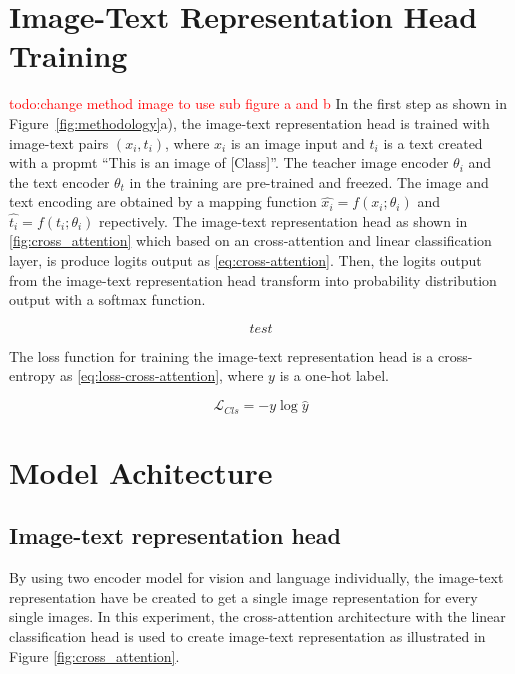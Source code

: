 \section{Image-Text Representation Head Training}
\textcolor{red}{todo:change method image to use sub figure a and b}
In the first step as shown in Figure~\ref{fig:methodology}a), the image-text representation head is trained with image-text pairs $(x_i, t_i)$, where $x_i$ is an image input and $t_i$ is a text created with a propmt ``This is an image of [Class]''.
The teacher image encoder $\theta_i$ and the text encoder $\theta_t$ in the training are pre-trained and freezed.
The image and text encoding are obtained by a mapping function $\hat{x_i} = f(x_i; \theta_i)$ and $\hat{t_i} = f(t_i; \theta_i)$ repectively. 
The image-text representation head as shown in \ref{fig:cross_attention} which based on an cross-attention and linear classification layer, is produce logits output as \ref{eq:cross-attention}.
Then, the logits output from the image-text representation head transform into probability distribution output with a softmax function.

\begin{equation} 
    \label{eq:cross-attention}
    test
\end{equation}

The loss function for training the image-text representation head is a cross-entropy as \ref{eq:loss-cross-attention}, where $y$ is a one-hot label.

\begin{equation}
    \label{eq:loss-cross-attention}
    \mathcal{L}_{Cls} = -y\log\hat{y}
\end{equation}



\section{Model Achitecture}
\subsection{Image-text representation head}
By using two encoder model for vision and language individually, the image-text representation have be created to get a single image representation for every single images.
In this experiment, the cross-attention  architecture with the linear classification head is used to create image-text representation as illustrated in Figure \ref{fig:cross_attention}.

